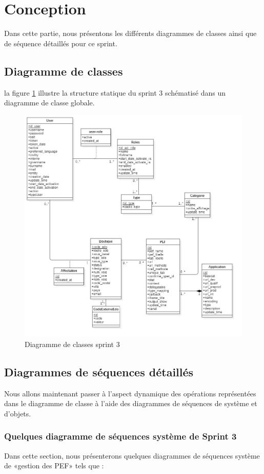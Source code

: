\section{Conception}
Dans cette partie, nous présentons les différents diagrammes de classes ainsi que de séquence détaillés pour ce sprint. \newpage
\subsection{Diagramme de classes}
la figure \ref{fig:classdiag-sprint3} illustre la structure statique du sprint 3 schématisé dans un diagramme de classe globale.
\begin{figure}[H]
	\centering
	\includegraphics[width=0.7\linewidth]{img/conception/classes/ClassDiag-sprint3}
	\caption[Diagramme de classes sprint 3]{Diagramme de classes sprint 3}
	\label{fig:classdiag-sprint3}
\end{figure}

\subsection{Diagrammes de séquences détaillés}
Nous allons maintenant passer à l’aspect dynamique des opérations représentées dans le diagramme de classe à l’aide des diagrammes de séquences de système et d’objets.
\subsubsection{Quelques diagramme de séquences système de Sprint 3}
Dans cette section, nous présenterons quelques diagrammes de séquences système de «gestion des PEF» tels que : \newpage

